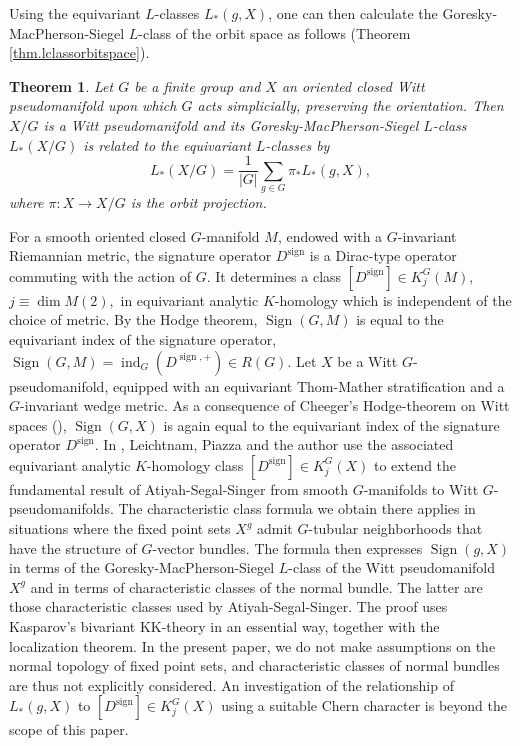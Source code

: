 \documentclass{amsart}
\newtheorem*{thm*}{Theorem}
\theoremstyle{definition}
\theoremstyle{remark}
\newcommand {\Sign}    {{\ensuremath{\operatorname{Sign}}}}
\newcommand {\sig}    {{\ensuremath{\operatorname{sign}}}}
\begin{document}
Using the equivariant $L$-classes $L_* (g,X)$, one can then
calculate the Goresky-MacPherson-Siegel $L$-class of the orbit
space as follows (Theorem \ref{thm.lclassorbitspace}).

\begin{thm*} 
Let $G$ be a finite group and $X$ an oriented closed Witt pseudomanifold
upon which $G$ acts simplicially, preserving the orientation.
Then $X/G$ is a Witt pseudomanifold and its
Goresky-MacPherson-Siegel $L$-class $L_* (X/G)$ is related to the
equivariant $L$-classes by 
\begin{equation} \label{equ.laverage}
L_* (X/G) 
    = \frac{1}{|G|} \sum_{g\in G} \pi_* L_* (g,X), 
\end{equation}
where $\pi: X \to X/G$ is the orbit projection.
\end{thm*}

For a smooth oriented closed $G$-manifold $M$, endowed
with a $G$-invariant Riemannian metric, the signature operator
$D^\sig$ is a Dirac-type operator commuting with the action of $G$.
It determines a class $[D^\sig] \in K^G_j (M),$ $j \equiv \dim M (2),$
in equivariant analytic $K$-homology
which is independent of the choice of metric.
By the Hodge theorem, $\Sign (G,M)$ is equal to the equivariant index
of the signature operator,
$\Sign (G,M) = \operatorname{ind}_G (D^{\sig, +}) \in R(G)$.
Let $X$ be a Witt $G$-pseudomanifold, equipped with an equivariant
Thom-Mather stratification and a $G$-invariant wedge metric.
As a consequence of Cheeger's Hodge-theorem
on Witt spaces  (\cite{cheeger}),
$\Sign (G,X)$ is again equal to the equivariant index of the signature 
operator $D^\sig$.
In \cite{blp}, Leichtnam, Piazza and the author use the associated
equivariant analytic $K$-homology class
$[D^\sig] \in K^G_j (X)$
to extend the fundamental result of Atiyah-Segal-Singer
from smooth $G$-manifolds to Witt $G$-pseudomanifolds.
The characteristic class formula we obtain there applies in situations
where the fixed point sets $X^g$ admit $G$-tubular neighborhoods
that have the structure of $G$-vector bundles.
The formula then expresses $\Sign (g,X)$
in terms of the Goresky-MacPherson-Siegel $L$-class of 
the Witt pseudomanifold $X^g$ and in terms 
of characteristic classes of the 
normal bundle. The latter are those characteristic classes used by Atiyah-Segal-Singer.
The proof uses Kasparov's bivariant KK-theory in an essential way, together
with the localization theorem.
In the present paper, we do not make assumptions on the normal topology
of fixed point sets, and characteristic classes of normal bundles are thus not
explicitly considered.
An investigation of the relationship of $L_* (g,X)$ to
$[D^\sig] \in K^G_j (X)$ using a suitable Chern character is beyond the
scope of this paper.
\end{document}
